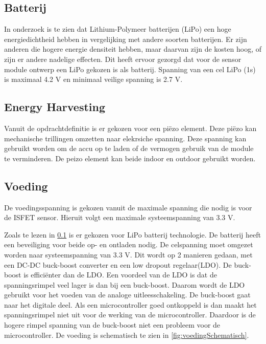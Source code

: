 \subsection{Batterij} \label{sec:battery}
In onderzoek \cite{BatteryComparison} is te zien dat Lithium-Polymeer batterijen (LiPo) een hoge energiedichtheid hebben in vergelijking met andere soorten batterijen. Er zijn anderen die hogere energie densiteit hebben, maar daarvan zijn de kosten hoog, of zijn er andere nadelige effecten\cite{BatteryComparison}. Dit heeft ervoor gezorgd dat voor de sensor module ontwerp een LiPo gekozen is als batterij. Spanning van een cel LiPo (1s) is maximaal 4.2 V en minimaal veilige spanning is 2.7 V\cite{BatteryComparison}.

\subsection{Energy Harvesting}

Vanuit de opdrachtdefinitie is er gekozen voor een piëzo element. Deze piëzo kan mechanische trillingen omzetten naar elekrsiche spanning. Deze spanning kan gebruikt worden om de accu op te laden of de vermogen gebruik van de module te verminderen. De peizo element kan beide indoor en outdoor gebruikt worden.


\subsection{Voeding} \label{sec:voeding}


De voedingsspanning is gekozen vanuit de maximale spanning die nodig is voor de ISFET sensor\cite{isfet}. Hieruit volgt een maximale systeemspanning van 3.3 V.


Zoals te lezen in \cref{sec:battery} is er gekozen voor LiPo batterij technologie. De batterij heeft een beveiliging voor beide op- en ontladen nodig. De celspanning moet omgezet worden naar systeemspanning van 3.3 V. Dit wordt op 2 manieren gedaan, met een DC-DC buck-boost converter en een low dropout regelaar(LDO). De buck-boost is efficiënter dan de LDO. Een voordeel van de LDO is dat de spanningsrimpel veel lager is dan bij een buck-boost. Daarom wordt de LDO gebruikt voor het voeden van de analoge uitleesschakeling. De buck-boost gaat naar het digitale deel. Als een microcontroller goed ontkoppeld is dan maakt het spanningsrimpel niet uit voor de werking van de microcontroller. Daardoor is de hogere rimpel spanning van de buck-boost niet een probleem voor de microcontroller. De voeding is schematisch te zien in \cref{fig:voedingSchematisch}.

